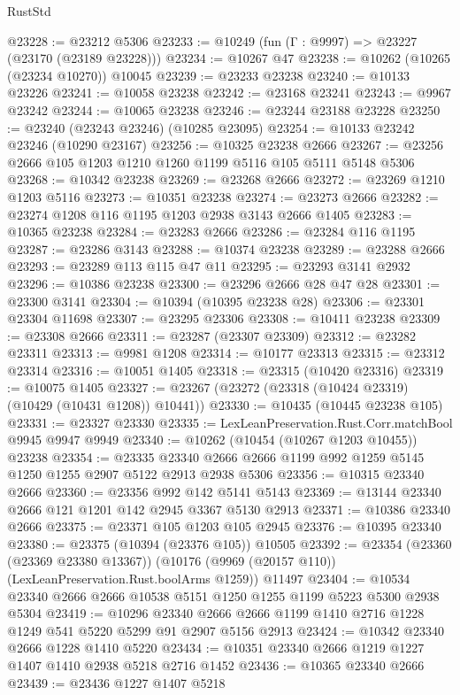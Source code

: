 \begin{lexlean}{RustStd}
\begin{coremodule}
@23228 := @23212 @5306
@23233 := @10249 (fun (Γ : @9997) => @23227 (@23170 (@23189 @23228)))
@23234 := @10267 @47
@23238 := @10262 (@10265 (@23234 @10270)) @10045
@23239 := @23233 @23238
@23240 := @10133 @23226
@23241 := @10058 @23238
@23242 := @23168 @23241
@23243 := @9967 @23242
@23244 := @10065 @23238
@23246 := @23244 @23188 @23228
@23250 := @23240 (@23243 @23246) (@10285 @23095)
@23254 := @10133 @23242 @23246 (@10290 @23167)
@23256 := @10325 @23238 @2666
@23267 := @23256 @2666 @105 @1203 @1210 @1260 @1199 @5116 @105 @5111 @5148 @5306
@23268 := @10342 @23238
@23269 := @23268 @2666
@23272 := @23269 @1210 @1203 @5116
@23273 := @10351 @23238
@23274 := @23273 @2666
@23282 := @23274 @1208 @116 @1195 @1203 @2938 @3143 @2666 @1405
@23283 := @10365 @23238
@23284 := @23283 @2666
@23286 := @23284 @116 @1195
@23287 := @23286 @3143
@23288 := @10374 @23238
@23289 := @23288 @2666
@23293 := @23289 @113 @115 @47 @11
@23295 := @23293 @3141 @2932
@23296 := @10386 @23238
@23300 := @23296 @2666 @28 @47 @28
@23301 := @23300 @3141
@23304 := @10394 (@10395 @23238 @28)
@23306 := @23301 @23304 @11698
@23307 := @23295 @23306
@23308 := @10411 @23238
@23309 := @23308 @2666
@23311 := @23287 (@23307 @23309)
@23312 := @23282 @23311
@23313 := @9981 @1208
@23314 := @10177 @23313
@23315 := @23312 @23314
@23316 := @10051 @1405
@23318 := @23315 (@10420 @23316)
@23319 := @10075 @1405
@23327 := @23267 (@23272 (@23318 (@10424 @23319) (@10429 (@10431 @1208)) @10441))
@23330 := @10435 (@10445 @23238 @105)
@23331 := @23327 @23330
@23335 := LexLeanPreservation.Rust.Corr.matchBool @9945 @9947 @9949
@23340 := @10262 (@10454 (@10267 @1203 @10455)) @23238
@23354 := @23335 @23340 @2666 @2666 @1199 @992 @1259 @5145 @1250 @1255 @2907 @5122 @2913 @2938 @5306
@23356 := @10315 @23340 @2666
@23360 := @23356 @992 @142 @5141 @5143
@23369 := @13144 @23340 @2666 @121 @1201 @142 @2945 @3367 @5130 @2913
@23371 := @10386 @23340 @2666
@23375 := @23371 @105 @1203 @105 @2945
@23376 := @10395 @23340
@23380 := @23375 (@10394 (@23376 @105)) @10505
@23392 := @23354
    (@23360 (@23369 @23380 @13367))
    (@10176 (@9969 (@20157 @110)) (LexLeanPreservation.Rust.boolArms @1259))
    @11497
@23404 := @10534 @23340 @2666 @2666 @10538 @5151 @1250 @1255 @1199 @5223 @5300 @2938 @5304
@23419 := @10296
    @23340
    @2666
    @2666
    @1199
    @1410
    @2716
    @1228
    @1249
    @541
    @5220
    @5299
    @91
    @2907
    @5156
    @2913
@23424 := @10342 @23340 @2666 @1228 @1410 @5220
@23434 := @10351 @23340 @2666 @1219 @1227 @1407 @1410 @2938 @5218 @2716 @1452
@23436 := @10365 @23340 @2666
@23439 := @23436 @1227 @1407 @5218

\end{coremodule}
\end{lexlean}
